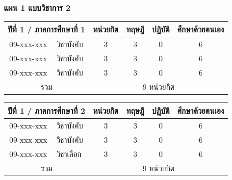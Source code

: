 \newpage
\subsubsection*{แผน 1 แบบวิชาการ 2}

\begin{tabular}{|cp{}|cccc|}
\hline
\multicolumn{2}{|c|}{ปีที่ 1 / ภาคการศึกษาที่ 1} & \multicolumn{1}{c|}{หน่วยกิต} & \multicolumn{1}{c|}{ทฤษฎี} & \multicolumn{1}{c|}{ปฏิบัติ} & ศึกษาด้วยตนเอง \\ \hline
\multicolumn{1}{|c|}{09-xxx-xxx}  & วิชาบังคับ  & \multicolumn{1}{c|}{3}        & \multicolumn{1}{c|}{3}     & \multicolumn{1}{c|}{0}       & 6             \\ \hline
\multicolumn{1}{|c|}{09-xxx-xxx}  & วิชาบังคับ  & \multicolumn{1}{c|}{3}        & \multicolumn{1}{c|}{3}     & \multicolumn{1}{c|}{0}       & 6             \\ \hline
\multicolumn{1}{|c|}{09-xxx-xxx}  & วิชาบังคับ  & \multicolumn{1}{c|}{3}        & \multicolumn{1}{c|}{3}     & \multicolumn{1}{c|}{0}       & 6             \\ \hline
\multicolumn{2}{|c|}{รวม}                        & \multicolumn{4}{c|}{9 หน่วยกิต}                                                                            \\ \hline
\end{tabular}

\vspace{5ex}\par\noindent
\begin{tabular}{|cp{}|cccc|}
\hline
\multicolumn{2}{|c|}{ปีที่ 1 / ภาคการศึกษาที่ 2} & \multicolumn{1}{c|}{หน่วยกิต} & \multicolumn{1}{c|}{ทฤษฎี} & \multicolumn{1}{c|}{ปฏิบัติ} & ศึกษาด้วยตนเอง \\ \hline
\multicolumn{1}{|c|}{09-xxx-xxx}  & วิชาบังคับ  & \multicolumn{1}{c|}{3}        & \multicolumn{1}{c|}{3}     & \multicolumn{1}{c|}{0}       & 6             \\ \hline
\multicolumn{1}{|c|}{09-xxx-xxx}  & วิชาบังคับ  & \multicolumn{1}{c|}{3}        & \multicolumn{1}{c|}{3}     & \multicolumn{1}{c|}{0}       & 6             \\ \hline
\multicolumn{1}{|c|}{09-xxx-xxx}  & วิชาเลือก  & \multicolumn{1}{c|}{3}        & \multicolumn{1}{c|}{3}     & \multicolumn{1}{c|}{0}       & 6             \\ \hline
\multicolumn{2}{|c|}{รวม}                        & \multicolumn{4}{c|}{9 หน่วยกิต}                                                                            \\ \hline
\end{tabular}

